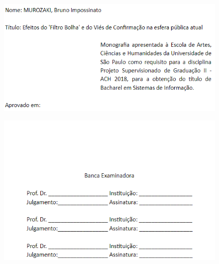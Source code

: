 \documentclass[
	12pt,				%
	oneside,			%
	a4paper,			%
	english,			%
	brazil				%
	]{abntex2ppgsi}
\begin{document}
\frenchspacing 


%
% 
%
\imprimircapa

\imprimirfolhaderosto


\begin{figure}[H]
	\includegraphics[scale=1]{folha_avaliacao1.png}
\end{figure}

\begin{figure}[H]
	\includegraphics[scale=1]{folha_avaliacao2.png}
\end{figure}
\end{document}

